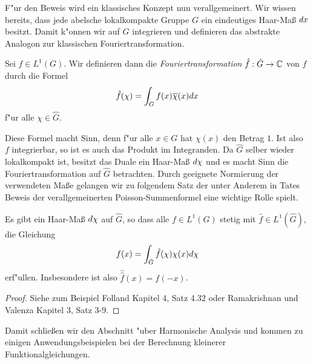 	F"ur den Beweis wird ein klassisches Konzept nun verallgemeinert.
	Wir wissen bereits, dass jede abelsche lokalkompakte Gruppe $G$ ein eindeutiges Haar-Maß $\dx$ besitzt.
	Damit k"onnen wir auf $G$ integrieren und definieren das abstrakte Analogon zur klassischen Fouriertransformation.
	\begin{defi}[Fouriertransformation]
		Sei $f\in L^1(G)$. Wir definieren dann die \emph{Fouriertransformation} $\hat{f}: \hat{G} \to \Komplex$ von $f$ durch die Formel
		\begin{align*}
			\hat{f}(\chi) = \int_G f(x)\conj{\chi}(x) dx
		\end{align*}
		f"ur alle $\chi \in \hat{G}$.
	\end{defi}
	Diese Formel macht Sinn, denn f"ur alle $x \in G$ hat $\chi(x)$ den Betrag $1$. 
	Ist also $f$ integrierbar, so ist es auch das Produkt im Integranden.
	Da $\hat{G}$ selber wieder lokalkompakt ist, besitzt das Duale ein Haar-Maß $\dx[\chi]$ und es macht Sinn die Fouriertransformation auf $\hat{G}$ betrachten.
	Durch geeignete Normierung der verwendeten Maße gelangen wir zu folgendem Satz der unter Anderem in Tates Beweis der verallgemeinerten Poisson-Summenformel eine wichtige Rolle spielt.
	\begin{satz}
		Es gibt ein Haar-Maß $\dx[\chi]$ auf $\hat{G}$, so dass alle $f \in L^1(G)$ stetig mit $\hat{f} \in L^1(\hat{G})$, die Gleichung
		\begin{align*}
			f(x) = \int_{\hat{G}} \hat{f}(\chi) \chi(x) \dx[\chi]
		\end{align*}
		erf"ullen. Insbesondere ist also $\hat{\hat{f}}(x) = f(-x)$.
	\end{satz}
	\begin{proof}
		Siehe zum Beispiel Folland \cite{folland} Kapitel 4, Satz 4.32 oder Ramakrishnan und Valenza \cite{rama} Kapitel 3, Satz 3-9.
	\end{proof}
	Damit schließen wir den Abschnitt "uber Harmonische Analysis und kommen zu einigen Anwendungsbeispielen bei der Berechnung kleinerer Funktionalgleichungen.

	
	
